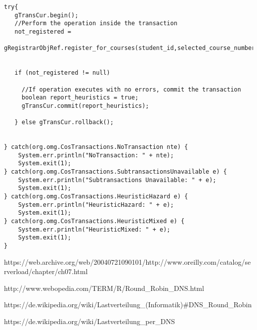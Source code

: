 \begin{lstlisting}[style=Java, caption=Implizite Transaktion \cite{tanenbaum2007verteilte}]
try{
   gTransCur.begin();
   //Perform the operation inside the transaction
   not_registered = 
       gRegistrarObjRef.register_for_courses(student_id,selected_course_numbers);


   if (not_registered != null)

     //If operation executes with no errors, commit the transaction
     boolean report_heuristics = true;
     gTransCur.commit(report_heuristics);

   } else gTransCur.rollback();


} catch(org.omg.CosTransactions.NoTransaction nte) {
    System.err.println("NoTransaction: " + nte);
    System.exit(1);
} catch(org.omg.CosTransactions.SubtransactionsUnavailable e) {
    System.err.println("Subtransactions Unavailable: " + e);
    System.exit(1);
} catch(org.omg.CosTransactions.HeuristicHazard e) {
    System.err.println("HeuristicHazard: " + e);
    System.exit(1);
} catch(org.omg.CosTransactions.HeuristicMixed e) {
    System.err.println("HeuristicMixed: " + e);
    System.exit(1);
}
\end{lstlisting}


https://web.archive.org/web/20040721090101/http://www.oreilly.com/catalog/serverload/chapter/ch07.html

http://www.webopedia.com/TERM/R/Round_Robin_DNS.html

https://de.wikipedia.org/wiki/Lastverteilung_(Informatik)#DNS_Round_Robin

https://de.wikipedia.org/wiki/Lastverteilung_per_DNS